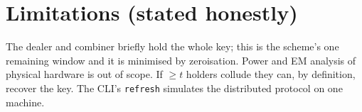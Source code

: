 \documentclass[11pt]{article}
\theoremstyle{remark}
\begin{document}
\section{Limitations (stated honestly)}\label{sec:limits}
The dealer and combiner briefly hold the whole key; this is the scheme's one
remaining window and it is minimised by zeroisation. Power and EM analysis of
physical hardware is out of scope. If $\ge t$ holders collude they can, by
definition, recover the key. The CLI's \texttt{refresh} simulates the
distributed protocol on one machine.
\end{document}
